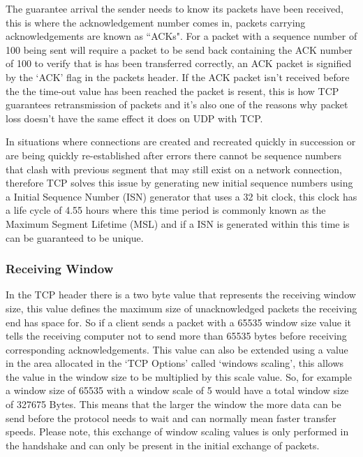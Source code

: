 The guarantee arrival the sender needs to know its packets have been received, this is where the acknowledgement number comes in, packets carrying acknowledgements are known as ``ACKs". For a packet with a sequence number of 100 being sent will require a packet to be send back containing the ACK number of 100 to verify that is has been transferred correctly, an ACK packet is signified by the `ACK' flag in the packets header. If the ACK packet isn't received before the the time-out value has been reached the packet is resent, this is how TCP guarantees retransmission of packets and it's also one of the reasons why packet loss doesn't have the same effect it does on UDP with TCP.

In situations where connections are created and recreated quickly in succession or are being quickly re-established after errors there cannot be sequence numbers that clash with previous segment that may still exist on a network connection, therefore TCP solves this issue by generating new initial sequence numbers using a Initial Sequence Number (ISN) generator that uses a 32 bit clock, this clock has a life cycle of 4.55 hours where this time period is commonly known as the Maximum Segment Lifetime (MSL) and if a ISN is generated within this time is can be guaranteed to be unique.

\subsubsection*{Receiving Window}
In the TCP header there is a two byte value that represents the receiving window size, this value defines the maximum size of unacknowledged packets the receiving end has space for. So if a client sends a packet with a 65535 window size value it tells the receiving computer not to send more than 65535 bytes before receiving corresponding acknowledgements. This value can also be extended using a value in the area allocated in the `TCP Options' called `windows scaling', this allows the value in the window size to be multiplied by this scale value. So, for example a window size of 65535 with a window scale of 5 would have a total window size of 327675 Bytes. This means that the larger the window the more data can be send before the protocol needs to wait and can normally mean faster transfer speeds. Please note, this exchange of window scaling values is only performed in the handshake and can only be present in the initial exchange of packets.

